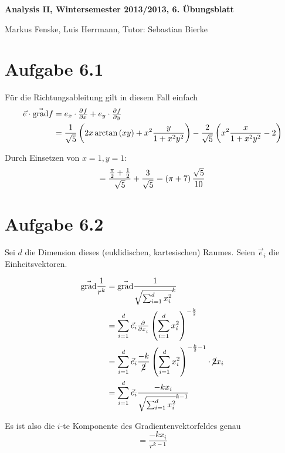 \documentclass[a4paper,german,12pt,smallheadings]{scrartcl}
\begin{document}
\begin{center}
\bfseries %
\sffamily %
\vspace{-40pt}
Analysis II, Wintersemester 2013/2013, 6. Übungsblatt

Markus Fenske, Luis Herrmann, Tutor: Sebastian Bierke
\vspace{-10pt}
\end{center}
\allowdisplaybreaks %
\section*{Aufgabe 6.1}
Für die Richtungsableitung gilt in diesem Fall einfach
\begin{align*}
  \vec{e} \cdot \vec{\operatorname{grad}} f &= e_x \cdot \pd{f}{x} + e_y \cdot \pd{f}{y} \\
                                            &= \frac{1}{\sqrt{5}} \del{2x \arctan\del{xy} + x^2 \frac{y}{1+x^2y^2}}
                                               - \frac{2}{\sqrt{5}} \del{x^2 \frac{x}{1+x^2y^2} - 2}
\end{align*}

Durch Einsetzen von $x=1, y=1$:
\begin{equation*}
  = \frac{\frac{\pi}{2} + \frac{1}{2}}{\sqrt{5}} + \frac{3}{\sqrt{5}} = \del{\pi+7}\frac{\sqrt{5}}{10}
\end{equation*}

\section*{Aufgabe 6.2}
Sei $d$ die Dimension dieses (euklidischen, kartesischen) Raumes. Seien
$\vec{e}_i$ die Einheitsvektoren.

\begin{align*}
  \vec{\operatorname{grad}} \frac{1}{r^k} &= \vec{\operatorname{grad}} \frac{1}{\sqrt{\sum_{i=1}^d x_i^2}^k} \\
                                          &= \sum_{i=1}^d \vec{e}_i \pd{}{x_i} \del{\sum_{i=1}^d x_i^2}^{-\frac{k}{2}} \\
                                          &= \sum_{i=1}^d \vec{e}_i \frac{-k}{\cancel{2}} \del{\sum_{i=1}^d x_i^2}^{-\frac{k}{2}-1} \cdot \cancel{2} x_i \\
                                          &= \sum_{i=1}^d \vec{e}_i \frac{-kx_i}{\sqrt{\sum_{i=1}^d x_i^2}^{k-1}}
\end{align*}

Es ist also die $i$-te Komponente des Gradientenvektorfeldes genau
\begin{equation*}
  = \frac{-k x_i}{r^{k-1}}
\end{equation*}
\end{document}
